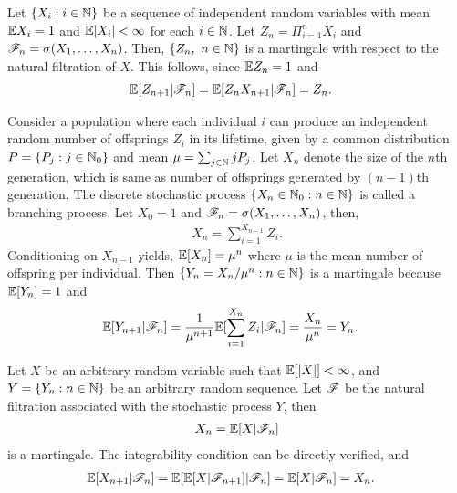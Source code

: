 \documentclass[a4paper,10pt,english]{article}
\begin{document}
\begin{shaded*}
\begin{exmp*}
Let $\{X_i: i \in \mathbb{N}\}$ be a sequence of independent random variables with mean $\mathbb{E} X_i = 1$ and $\mathbb{E}|X_i| < \infty$ for each $i \in \mathbb{N}$. 
Let $Z_n=\Pi_{i=1}^n X_i$ and $\mathscr{F}_n = \sigma(X_1, \dots, X_n)$. 
Then, $\{Z_n,~n \in \mathbb{N} \}$ is a martingale with respect to the natural filtration of $X$. 
This follows, since $\mathbb{E} Z_n=1$ and 
\begin{align*}
\mathbb{E}[Z_{n+1}|\mathscr{F}_n] =\mathbb{E}[Z_{n}X_{n+1}|\mathscr{F}_n] &=Z_n.
\end{align*} 
\end{exmp*}
\end{shaded*}

\begin{shaded*}
\begin{exmp*} 
Consider a population where each individual $i$ can produce an independent random number of offsprings $Z_i$ in its lifetime, given by a common distribution $P= \{P_j : j \in \mathbb{N}_0\}$ and mean $\mu = \sum_{j \in \mathbb{N}}jP_j$.  
Let $X_n$ denote the size of the $n$th generation, which is same as number of offsprings generated by $(n-1)$th generation. 
The discrete stochastic process $\{X_n \in \mathbb{N}_0: n \in \mathbb{N}\}$ is called a branching process. 
Let $X_0=1$ and $\mathscr{F}_n = \sigma(X_1, \dots, X_n)$, then,
\begin{align*}
X_n = \sum_{i=1}^{X_{n-1}}Z_i.
\end{align*}
Conditioning on $X_{n-1}$ yields, $\mathbb{E}[X_n]= \mu^n$ where $\mu$ is the mean number of offspring per individual. Then $\{Y_n = X_n / \mu^n: n \in \mathbb{N}\}$ is a martingale because $\mathbb{E}[Y_n]= 1$ and 
\begin{align*}
\E[Y_{n+1}|\F_n] %
&= \frac{1}{\mu^{n+1}}\E[\sum_{i=1}^{X_{n}}Z_i|\F_n]
= \frac{X_n}{\mu^n}=Y_n.
\end{align*}
\end{exmp*}
\end{shaded*}

\begin{shaded*}
\begin{exmp*} 
Let $X$ be an arbitrary random variable such that $\mathbb{E}[|X|]< \infty$, and $Y = \{Y_n: n \in \mathbb{N}\}$ be an arbitrary random sequence. 
Let $\mathscr{F}$ be the natural filtration associated with the stochastic process $Y$, then
\begin{align*}
X_n = \mathbb{E}[X|\mathscr{F}_n]
\end{align*}
is a martingale. 
The integrability condition can be directly verified, and
\begin{align*}
\mathbb{E}[X_{n+1}|\mathscr{F}_n]&= \mathbb{E}[\mathbb{E}[X|\mathscr{F}_{n+1}]|\mathscr{F}_{n}] = \mathbb{E}[X|\mathscr{F}_{n}] = X_n.
\end{align*} 
\end{exmp*}
\end{shaded*}
\end{document}
